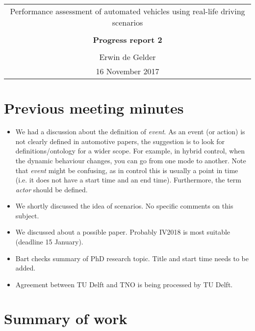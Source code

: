 \documentclass[10pt,final,a4paper,oneside,onecolumn]{article}
\newcommand{\progressreportnumber}{2}
\renewcommand{\author}{Erwin de Gelder}
\renewcommand{\date}{16 November 2017}
\renewcommand{\title}{Performance assessment of automated vehicles using real-life driving scenarios}
\begin{document}
	
\begin{center}
	\begin{tabular}{c}
		\title \\ \\
		\textbf{\huge Progress report \progressreportnumber} \\ \\
		\author \\ 
		\date
	\end{tabular}
\end{center}

\section{Previous meeting minutes}

\begin{itemize}
	\item We had a discussion about the definition of \emph{event}. As an event (or action) is not clearly defined in automotive papers, the suggestion is to look for definitions/ontology for a wider scope. For example, in hybrid control, when the dynamic behaviour changes, you can go from one mode to another. Note that \emph{event} might be confusing, as in control this is usually a point in time (i.e. it does not have a start time and an end time). Furthermore, the term \emph{actor} should be defined.
	\item We shortly discussed the idea of scenarios. No specific comments on this subject.
	\item We discussed about a possible paper. Probably IV2018 is most suitable (deadline 15 January).
	\item Bart checks summary of PhD research topic. Title and start time needs to be added.
	\item Agreement between TU Delft and TNO is being processed by TU Delft. 
\end{itemize}

\section{Summary of work}
\end{document}

